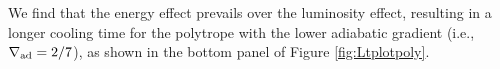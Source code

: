 \documentclass[apj]{emulateapj}
\newcommand{\delad}{\nabla_{\rm ad}}
\begin{document}
We find that the energy effect prevails over the luminosity effect, resulting in a longer cooling time for the polytrope with the lower adiabatic gradient (i.e., $\delad=2/7$), as shown in the bottom panel of Figure \ref{fig:Ltplotpoly}.







\end{document}
